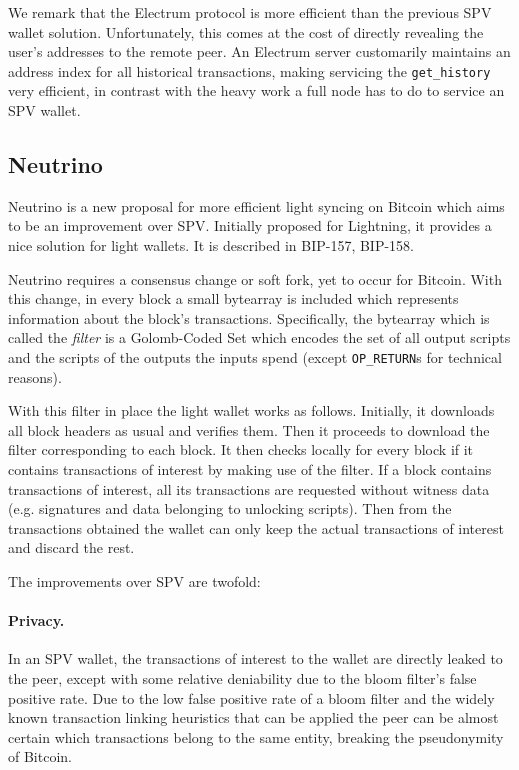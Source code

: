 \documentclass[sigconf]{acmart}
\begin{document}
We remark that the Electrum protocol is more efficient than the previous SPV wallet solution. Unfortunately, this comes at the cost of directly revealing the user's addresses to the remote peer. An Electrum server customarily maintains an address index for all historical transactions, making servicing the \texttt{get\_history} very efficient, in contrast with the heavy work a full node has to do to service an SPV wallet.
\subsection{Neutrino}
Neutrino is a new proposal for more efficient light syncing on Bitcoin which aims to be an improvement over SPV. Initially proposed for Lightning, it provides a nice solution for light wallets. It is described in BIP-157, BIP-158.

Neutrino requires a consensus change or soft fork, yet to occur for Bitcoin. With this change, in every block a small bytearray is included which represents information about the block's transactions. Specifically, the bytearray which is called the \emph{filter} is a Golomb-Coded Set
which encodes the set of all output scripts and the scripts of the outputs the inputs spend (except \texttt{OP\_RETURN}s for technical reasons).

With this filter in place the light wallet works as follows. Initially, it downloads all block headers as usual and verifies them. Then it proceeds to download the filter corresponding to each block. It then checks locally for every block if it contains transactions of interest by making use of the filter. If a block contains transactions of interest, all its transactions are requested without witness data (e.g. signatures and data belonging to unlocking scripts). Then from the transactions obtained the wallet can only keep the actual transactions of interest and discard the rest.

The improvements over SPV are twofold:
\paragraph{Privacy.} In an SPV wallet, the transactions of interest to the wallet are directly leaked to the peer, except with some relative deniability due to the bloom filter's false positive rate. Due to the low false positive rate of a bloom filter and the widely known transaction linking heuristics that can be applied
the peer can be almost certain which transactions belong to the same entity, breaking the pseudonymity of Bitcoin.
\end{document}
